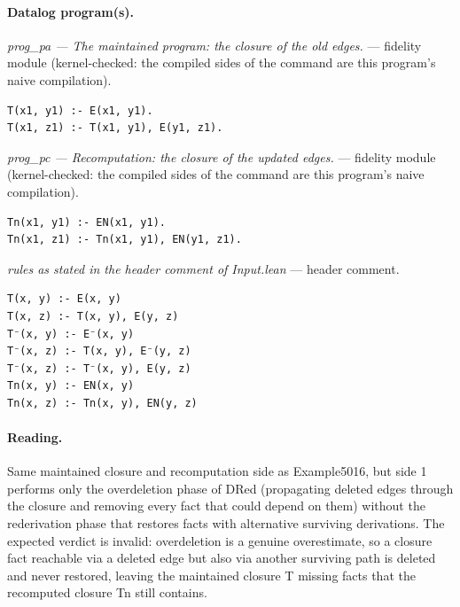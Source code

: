 \documentclass[10pt]{article}
\begin{document}
\paragraph{Datalog program(s).}

{\raggedright\textit{prog\_pa --- The maintained program: the closure of the old edges.} --- fidelity module (kernel-checked: the compiled sides of the command are this program's naive compilation).\par}

\begin{Verbatim}[fontsize=\scriptsize,breaklines=true,breakanywhere=true,frame=single,framesep=1.5mm]
T(x1, y1) :- E(x1, y1).
T(x1, z1) :- T(x1, y1), E(y1, z1).
\end{Verbatim}

{\raggedright\textit{prog\_pc --- Recomputation: the closure of the updated edges.} --- fidelity module (kernel-checked: the compiled sides of the command are this program's naive compilation).\par}

\begin{Verbatim}[fontsize=\scriptsize,breaklines=true,breakanywhere=true,frame=single,framesep=1.5mm]
Tn(x1, y1) :- EN(x1, y1).
Tn(x1, z1) :- Tn(x1, y1), EN(y1, z1).
\end{Verbatim}

{\raggedright\textit{rules as stated in the header comment of Input.lean} --- header comment.\par}

\begin{Verbatim}[fontsize=\scriptsize,breaklines=true,breakanywhere=true,frame=single,framesep=1.5mm]
T(x, y) :- E(x, y)
T(x, z) :- T(x, y), E(y, z)
T⁻(x, y) :- E⁻(x, y)
T⁻(x, z) :- T(x, y), E⁻(y, z)
T⁻(x, z) :- T⁻(x, y), E(y, z)
Tn(x, y) :- EN(x, y)
Tn(x, z) :- Tn(x, y), EN(y, z)
\end{Verbatim}

\paragraph{Reading.} Same maintained closure and recomputation side as Example5016, but side 1 performs only the overdeletion phase of DRed (propagating deleted edges through the closure and removing every fact that could depend on them) without the rederivation phase that restores facts with alternative surviving derivations. The expected verdict is invalid: overdeletion is a genuine overestimate, so a closure fact reachable via a deleted edge but also via another surviving path is deleted and never restored, leaving the maintained closure T missing facts that the recomputed closure Tn still contains.
\end{document}
